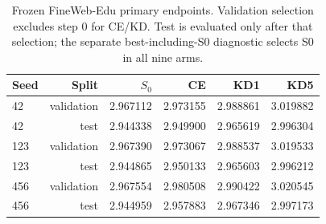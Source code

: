 \begingroup\small
\setlength{\tabcolsep}{5pt}
\begin{table}[htbp]\centering
\begin{tabular}{lrrrrr}
\toprule
Seed & Split & $S_0$ & CE & KD1 & KD5 \\
\midrule
42 & validation & 2.967112 & 2.973155 & 2.988861 & 3.019882 \\
42 & test & 2.944338 & 2.949900 & 2.965619 & 2.996304 \\
123 & validation & 2.967390 & 2.973067 & 2.988537 & 3.019533 \\
123 & test & 2.944865 & 2.950133 & 2.965603 & 2.996212 \\
456 & validation & 2.967554 & 2.980508 & 2.990422 & 3.020545 \\
456 & test & 2.944959 & 2.957883 & 2.967346 & 2.997173 \\
\bottomrule
\end{tabular}
\caption{Frozen FineWeb-Edu primary endpoints. Validation selection excludes step 0 for CE/KD. Test is evaluated only after that selection; the separate best-including-S0 diagnostic selects S0 in all nine arms.}\label{tab:modern_endpoints}
\end{table}
\endgroup
